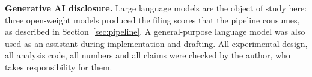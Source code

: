 \documentclass[sigconf]{acmart}
\begin{document}
\medskip\noindent\textbf{Generative AI disclosure.} Large language models are the object of study
here: three open-weight models produced the \NumCalls{} filing scores that the pipeline consumes,
as described in Section~\ref{sec:pipeline}. A general-purpose language model was also used as an
assistant during implementation and drafting. All experimental design, all analysis code, all
numbers and all claims were checked by the author, who takes responsibility for them.



\end{document}
